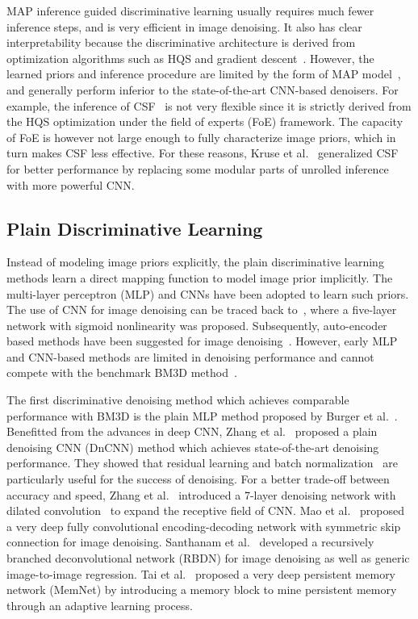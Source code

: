 \documentclass[journal]{IEEEtran}
\begin{document}
MAP inference guided discriminative learning usually requires much fewer inference steps, and is very efficient in image denoising. It also has clear interpretability because the discriminative architecture is derived from optimization algorithms such as HQS and gradient descent~\cite{schmidt2014shrinkage,barbu2009training,samuel2009learning,sun2011learning,chen2015trainable}. However, the learned priors and inference procedure are limited by the form of MAP model~\cite{tuprints6044}, and generally perform inferior to the state-of-the-art CNN-based denoisers.
For example, the inference of CSF~\cite{schmidt2014shrinkage} is not very flexible since it is strictly derived from the HQS optimization under the field of experts (FoE) framework. The capacity of FoE is however not large enough to fully characterize image priors, which in turn makes CSF less effective.
For these reasons, Kruse et al.~\cite{Kruse_2017_ICCV} generalized CSF for better performance by replacing some modular parts of unrolled inference with more powerful CNN.

\vspace{-0.2cm}
\subsection{Plain Discriminative Learning}

Instead of modeling image priors explicitly, the plain discriminative learning methods learn a direct mapping function to model image prior implicitly. The multi-layer perceptron (MLP) and CNNs have been adopted to learn such priors.
The use of CNN for image denoising can be traced back to~\cite{jain2009natural}, where a five-layer network with sigmoid nonlinearity was proposed. Subsequently, auto-encoder based methods have been suggested for image denoising~\cite{xie2012image,agostinelli2013robust}.
However, early MLP and CNN-based methods are limited in denoising performance and cannot compete with the benchmark BM3D method~\cite{dabov2007image}.

The first discriminative denoising method which achieves comparable performance with BM3D is the plain MLP method proposed by Burger et al.~\cite{burger2012image}.  Benefitted from the advances in deep CNN, Zhang et al.~\cite{zhang2017beyond} proposed a plain denoising CNN (DnCNN) method which achieves state-of-the-art denoising performance. They showed that residual learning and batch normalization~\cite{ioffe2015batch} are particularly useful for the success of denoising.
For a better trade-off between accuracy and speed, Zhang et al.~\cite{zhang2017learning} introduced a 7-layer denoising network with dilated convolution~\cite{yu2015multi} to expand the receptive field of CNN. Mao et al.~\cite{mao2016} proposed a very deep fully convolutional encoding-decoding network with symmetric skip connection for image denoising.
Santhanam et al.~\cite{santhanam2016generalized} developed a recursively branched deconvolutional network (RBDN) for image denoising as well as generic image-to-image regression.
Tai et al.~\cite{tai2017memnet} proposed a very deep persistent memory network (MemNet) by introducing a memory block to mine persistent memory through an adaptive learning process.
\end{document}
